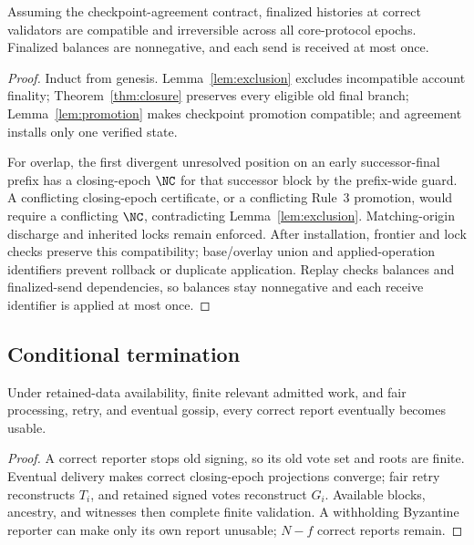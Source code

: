 \begin{theorem}
\label{thm:safety}
Assuming the checkpoint-agreement contract, finalized histories at correct validators are compatible and irreversible across all core-protocol epochs. Finalized balances are nonnegative, and each send is received at most once.
\end{theorem}
\begin{proof}
Induct from genesis. Lemma~\ref{lem:exclusion} excludes incompatible account finality; Theorem~\ref{thm:closure} preserves every eligible old final branch; Lemma~\ref{lem:promotion} makes checkpoint promotion compatible; and agreement installs only one verified state.

For overlap, the first divergent unresolved position on an early successor-final prefix has a closing-epoch $\NC$ for that successor block by the prefix-wide guard. A conflicting closing-epoch certificate, or a conflicting Rule~3 promotion, would require a conflicting $\NC$, contradicting Lemma~\ref{lem:exclusion}. Matching-origin discharge and inherited locks remain enforced. After installation, frontier and lock checks preserve this compatibility; base/overlay union and applied-operation identifiers prevent rollback or duplicate application. Replay checks balances and finalized-send dependencies, so balances stay nonnegative and each receive identifier is applied at most once.
\end{proof}

\subsection{Conditional termination}
\begin{lemma}
\label{lem:reports-live}
Under retained-data availability, finite relevant admitted work, and fair processing, retry, and eventual gossip, every correct report eventually becomes usable.
\end{lemma}
\begin{proof}
A correct reporter stops old signing, so its old vote set and roots are finite. Eventual delivery makes correct closing-epoch projections converge; fair retry reconstructs $T_i$, and retained signed votes reconstruct $G_i$. Available blocks, ancestry, and witnesses then complete finite validation. A withholding Byzantine reporter can make only its own report unusable; $N-f$ correct reports remain.
\end{proof}

